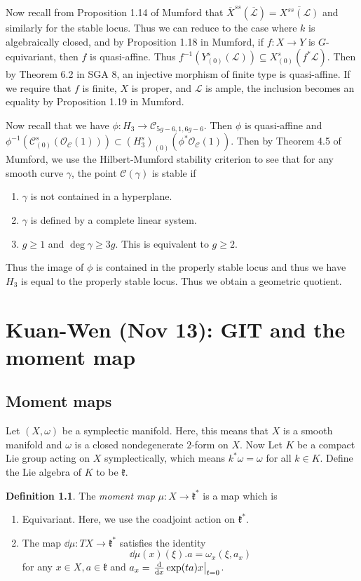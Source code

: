 \documentclass[leqno, openany]{memoir}
\theoremstyle{definition}
\newtheorem{defn}[thm]{Definition}
\theoremstyle{remark}
\theoremstyle{plain}
\theoremstyle{definition}
\theoremstyle{remark}
\newcommand{\mc}[1]{\mathcal{#1}}
\newcommand{\mf}[1]{\mathfrak{#1}}
\newcommand{\ol}[1]{\overline{#1}}
\begin{document}
Now recall from Proposition 1.14 of Mumford that $\ol{X}^{ss}(\ol{\mc{L}}) =
\ol{X^{ss}(\mc{L})}$ and similarly for the stable locus. Thus we can reduce to
the case where $k$ is algebraically closed, and by Proposition 1.18 in Mumford,
if $f \colon X \to Y$ is $G$-equivariant, then $f$ is quasi-affine. Thus
$f^{-1}(Y_{(0)}^s(\mc{L})) \subseteq X_{(0)}^s(f^* \mc{L})$. Then by Theorem
6.2 in SGA 8, an injective morphism of finite type is quasi-affine. If we
require that $f$ is finite, $X$ is proper, and $\mc{L}$ is ample, the inclusion
becomes an equality by Proposition 1.19 in Mumford.

Now recall that we have $\phi \colon H_3 \to \mc{C}_{5g-6, 1, 6g-6}$. Then
$\phi$ is quasi-affine and $\phi^{-1}(\mc{C}_{(0)}^s ( \mc{O}_{\mc{C}}(1) ))
\subset (H_3^s)_{(0)}(\phi^* \mc{O}_{\mc{C}}(1))$. Then by Theorem 4.5 of
Mumford, we use the Hilbert-Mumford stability criterion to see that for any
smooth curve $\gamma$, the point $\mc{C}(\gamma)$ is stable if
\begin{enumerate} \item $\gamma$ is not contained in a hyperplane.  \item
$\gamma$ is defined by a complete linear system.  \item $g \geq 1$ and $\deg
\gamma \geq 3g$. This is equivalent to $g \geq 2$.  \end{enumerate} Thus the
image of $\phi$ is contained in the properly stable locus and thus we have
$H_3$ is equal to the properly stable locus. Thus we obtain a geometric
quotient.

\chapter{Kuan-Wen (Nov 13): GIT and the moment map}%
\label{cha:kuan_wen_nov_13_git_and_the_moment_map}

\section{Moment maps}%

Let $(X, \omega)$ be a symplectic manifold. Here, this means that $X$ is a
smooth manifold and $\omega$ is a closed nondegenerate $2$-form on $X$. Now Let
$K$ be a compact Lie group acting on $X$ symplectically, which means $k^*
\omega = \omega$ for all $k \in K$. Define the Lie algebra of $K$ to be
$\mf{k}$.

\begin{defn} The \textit{moment map} $\mu \colon X \to \mf{k}^*$ is a map which
    is \begin{enumerate} \item Equivariant. Here, we use the coadjoint action
        on $\mf{k}^*$.  \item The map $\dd{\mu} \colon T X \to \mf{k}^*$
        satisfies the identity \[ \dd{\mu}(x)(\xi) . a = \omega_x(\xi, a_x) \]
for any $x \in X, a \in \mf{k}$ and $a_x = \eval{\dv{x} \exp(ta)x}_{t=0}$.
\end{enumerate} \end{defn}
\end{document}
